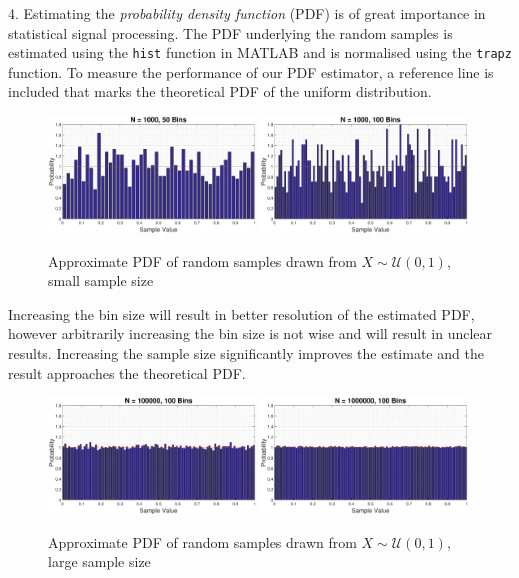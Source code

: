 \documentclass{article}
\begin{document}
4. Estimating the \textit{probability density function} (PDF) is of great importance in statistical signal processing. The PDF underlying the random samples is estimated using the {\tt hist} function in MATLAB and is normalised using the {\tt trapz} function. To measure the performance of our PDF estimator, a reference line is included that marks the theoretical PDF of the uniform distribution.
\begin{figure}[H]
\includegraphics[width=0.49\textwidth]{N_1000_B_50_rand}
\includegraphics[width=0.49\textwidth]{N_1000_B_100_rand}
\caption{Approximate PDF of random samples drawn from $X\sim \mathcal{U}(0,1)$, small sample size}
\end{figure}

Increasing the bin size will result in better resolution of the estimated PDF, however arbitrarily increasing the bin size is not wise and will result in unclear results. Increasing the sample size significantly improves the estimate and the result approaches the theoretical PDF.

\begin{figure}[H]
\includegraphics[width=0.49\textwidth]{N_100000_B_100_rand}
\includegraphics[width=0.49\textwidth]{N_1000000_B_100_rand}
\caption{Approximate PDF of random samples drawn from $X\sim \mathcal{U}(0,1)$, large sample size}
\end{figure}
\end{document}
